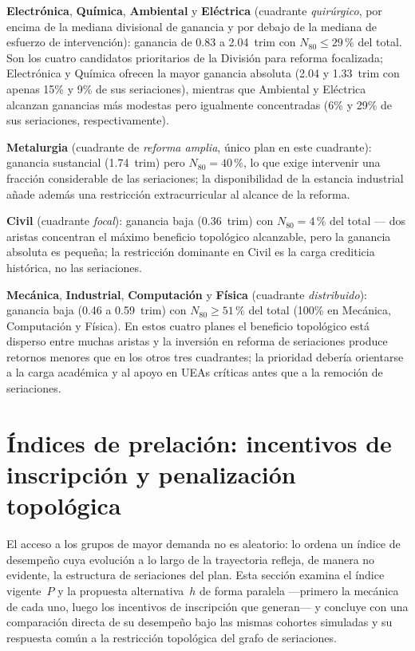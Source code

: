 \documentclass[11pt,letterpaper]{article}
\begin{document}
\textbf{Electrónica}, \textbf{Química}, \textbf{Ambiental} y
\textbf{Eléctrica} (cuadrante \emph{quirúrgico}, por encima de la mediana
divisional de ganancia y por debajo de la mediana de esfuerzo de
intervención): ganancia de 0.83 a 2.04~trim con $N_{80} \leq 29\,\text{\%}$
del total.
Son los cuatro candidatos prioritarios de la División para reforma
focalizada; Electrónica y Química ofrecen la mayor ganancia absoluta
(2.04 y 1.33~trim con apenas 15\% y 9\% de sus seriaciones), mientras que
Ambiental y Eléctrica alcanzan ganancias más modestas pero igualmente
concentradas (6\% y 29\% de sus seriaciones, respectivamente).

\textbf{Metalurgia} (cuadrante de \emph{reforma amplia}, único plan en este
cuadrante): ganancia sustancial (1.74~trim) pero $N_{80}=40\,\text{\%}$, lo
que exige intervenir una fracción considerable de las seriaciones; la
disponibilidad de la estancia industrial añade además una restricción
extracurricular al alcance de la reforma.

\textbf{Civil} (cuadrante \emph{focal}): ganancia baja (0.36~trim) con
$N_{80}=4\,\text{\%}$ del total --- dos aristas concentran el máximo
beneficio topológico alcanzable, pero la ganancia absoluta es pequeña; la
restricción dominante en Civil es la carga crediticia histórica, no las
seriaciones.

\textbf{Mecánica}, \textbf{Industrial}, \textbf{Computación} y
\textbf{Física} (cuadrante \emph{distribuido}): ganancia baja (0.46 a
0.59~trim) con $N_{80} \geq 51\,\text{\%}$ del total (100\% en Mecánica,
Computación y Física).
En estos cuatro planes el beneficio topológico está disperso entre muchas
aristas y la inversión en reforma de seriaciones produce retornos menores
que en los otros tres cuadrantes; la prioridad debería orientarse a la carga
académica y al apoyo en UEAs críticas antes que a la remoción de
seriaciones.

\section{Índices de prelación: incentivos de inscripción y penalización topológica}
\label{sec:indice_desempenio}

El acceso a los grupos de mayor demanda no es aleatorio: lo ordena un índice
de desempeño cuya evolución a lo largo de la trayectoria refleja, de manera
no evidente, la estructura de seriaciones del plan.
Esta sección examina el índice vigente~$P$ y la propuesta alternativa~$h$
de forma paralela ---primero la mecánica de cada uno, luego los incentivos de
inscripción que generan--- y concluye con una comparación directa de su
desempeño bajo las mismas cohortes simuladas y su respuesta común a la
restricción topológica del grafo de seriaciones.
\end{document}
